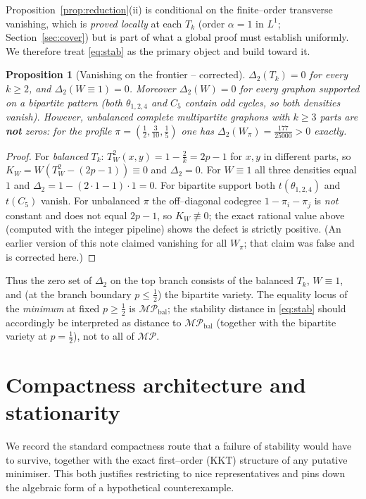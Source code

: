 \documentclass[11pt]{article}
\newtheorem{proposition}[theorem]{Proposition}
\theoremstyle{definition}
\newcommand{\MP}{\mathcal{MP}}
\newcommand{\tw}{T_W}
\newcommand{\kw}{K_W}
\newcommand{\Tk}{T_k}
\begin{document}
Proposition~\ref{prop:reduction}(ii) is conditional on the finite--order transverse
vanishing, which is \emph{proved locally} at each $\Tk$ (order $\alpha=1$ in $L^1$;
Section~\ref{sec:cover}) but is part of what a global proof must establish
uniformly.  We therefore treat \eqref{eq:stab} as the primary object and build
toward it.

\begin{proposition}[Vanishing on the frontier -- corrected]\label{prop:vanish}
$\Delta_2(\Tk)=0$ for every $k\ge2$, and $\Delta_2(W\equiv1)=0$.  Moreover
$\Delta_2(W)=0$ for every graphon supported on a bipartite pattern (both
$\theta_{1,2,4}$ and $C_5$ contain odd cycles, so both densities vanish).
However, \emph{unbalanced} complete multipartite graphons with $k\ge3$ parts are
\textbf{not} zeros: for the profile $\pi=(\tfrac12,\tfrac3{10},\tfrac15)$ one has
$\Delta_2(W_\pi)=\tfrac{177}{25000}>0$ exactly.
\end{proposition}

\begin{proof}
For \emph{balanced} $\Tk$: $\tw^2(x,y)=1-\tfrac2k=2p-1$ for $x,y$ in different
parts, so $\kw=W(\tw^2-(2p-1))\equiv0$ and $\Delta_2=0$.  For $W\equiv1$ all
three densities equal $1$ and $\Delta_2=1-(2\cdot1-1)\cdot1=0$.  For bipartite
support both $t(\theta_{1,2,4})$ and $t(C_5)$ vanish.  For unbalanced $\pi$ the
off--diagonal codegree $1-\pi_i-\pi_j$ is \emph{not} constant and does not equal
$2p-1$, so $\kw\not\equiv0$; the exact rational value above (computed with the
integer pipeline) shows the defect is strictly positive.  (An earlier version of
this note claimed vanishing for all $W_\pi$; that claim was false and is
corrected here.)
\end{proof}

Thus the zero set of $\Delta_2$ on the top branch consists of the balanced
$\Tk$, $W\equiv1$, and (at the branch boundary $p\le\tfrac12$) the bipartite
variety.  The equality locus of the \emph{minimum} at fixed $p\ge\tfrac12$ is
$\MP_{\mathrm{bal}}$; the stability distance in \eqref{eq:stab} should
accordingly be interpreted as distance to $\MP_{\mathrm{bal}}$ (together with the
bipartite variety at $p=\tfrac12$), not to all of $\MP$.

\section{Compactness architecture and stationarity}\label{sec:compactness}

We record the standard compactness route that a failure of stability would have to
survive, together with the exact first--order (KKT) structure of any putative
minimiser.  This both justifies restricting to nice representatives and pins down
the algebraic form of a hypothetical counterexample.
\end{document}
